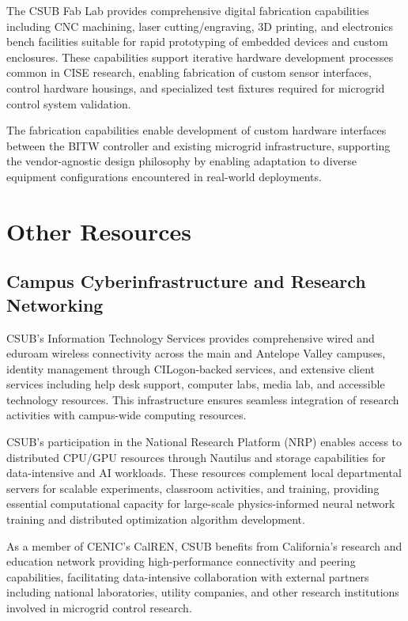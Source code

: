 \documentclass[12pt]{article}
\begin{document}
The CSUB Fab Lab provides comprehensive digital fabrication capabilities including CNC machining, laser cutting/engraving, 3D printing, and electronics bench facilities suitable for rapid prototyping of embedded devices and custom enclosures. These capabilities support iterative hardware development processes common in CISE research, enabling fabrication of custom sensor interfaces, control hardware housings, and specialized test fixtures required for microgrid control system validation.

The fabrication capabilities enable development of custom hardware interfaces between the BITW controller and existing microgrid infrastructure, supporting the vendor-agnostic design philosophy by enabling adaptation to diverse equipment configurations encountered in real-world deployments.

\section{Other Resources}

\subsection{Campus Cyberinfrastructure and Research Networking}

CSUB's Information Technology Services provides comprehensive wired and eduroam wireless connectivity across the main and Antelope Valley campuses, identity management through CILogon-backed services, and extensive client services including help desk support, computer labs, media lab, and accessible technology resources. This infrastructure ensures seamless integration of research activities with campus-wide computing resources.

CSUB's participation in the National Research Platform (NRP) enables access to distributed CPU/GPU resources through Nautilus and storage capabilities for data-intensive and AI workloads. These resources complement local departmental servers for scalable experiments, classroom activities, and training, providing essential computational capacity for large-scale physics-informed neural network training and distributed optimization algorithm development.

As a member of CENIC's CalREN, CSUB benefits from California's research and education network providing high-performance connectivity and peering capabilities, facilitating data-intensive collaboration with external partners including national laboratories, utility companies, and other research institutions involved in microgrid control research.
\end{document}
